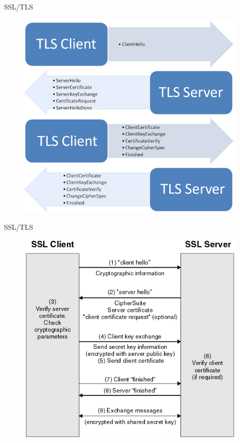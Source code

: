 \documentclass[pdf]{beamer}
\begin{document}
\begin{frame}{SSL/TLS}
\begin{figure}[t]
\centering
\includegraphics[scale=0.5]{Images/sslflow}
\end{figure}
\end{frame}



\begin{frame}{SSL/TLS}
\begin{figure}[t]
\centering
\includegraphics[scale=0.7]{Images/sslflow2}
\end{figure}
\end{frame}
\end{document}
